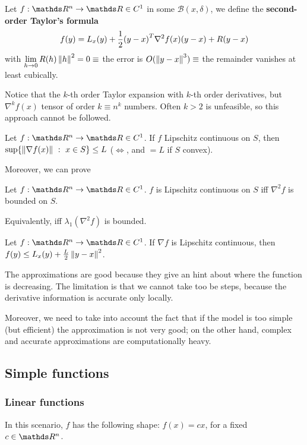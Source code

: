 \documentclass[computationalMathematics.tex]{subfiles}
\begin{document}
\begin{definition}
Let $f : \R^n \to \R \in C^1$ in some $\mathcal{B}(x, \delta)$, we define the \textbf{second-order Taylor's formula}  
\[
  f(y) = L_x(y) + \frac{1}{2} {(y - x)}^{T} \nabla^2 f(x) (y - x) + R(y - x)
\]
  with $\lim\limits_{h \to 0} R(h) \left\lVert h\right\rVert^2 = 0 \equiv$ the error is $O(\left\lVert y - x\right\rVert^3) \equiv$ the remainder vanishes at least cubically.
\end{definition}

Notice that the $k$-th order Taylor expansion with $k$-th order derivatives, but $\nabla^k f(x)$ tensor of order $k \equiv n^k$ numbers.
Often $k > 2$ is unfeasible, so this approach cannot be followed.

\begin{proposition}
  Let $f : \R^n \to \R \in C^1$. If $f$ Lipschitz continuous on $S$, then $\sup \{\left\lVert\nabla f(x)\right\rVert~:~x \in S\} \leq L$ ($\iff$, and $= L$ if $S$ convex).
\end{proposition}

Moreover, we can prove

\begin{proposition}
Let $f : \R^n \to \R \in C^1$. $f$ is Lipschitz continuous on $S$ iff $\nabla^2 f$ is bounded on $S$.

Equivalently, iff $\lambda_1(\nabla^2 f)$ is bounded.
\end{proposition}

\begin{proposition}
  Let $f : \R^n \to \R \in C^1$. If $\nabla f$ is Lipschitz continuous, then $f(y) \leq L_x(y) + \frac{L}{2} \left\lVert y - x\right\rVert^2$.
\end{proposition}

The approximations are good because they give an hint about where the function is decreasing.
The limitation is that we cannot take too be steps, because the derivative information is accurate only locally.

Moreover, we need to take into account the fact that if the model is too simple (but efficient) the approximation is not very good; on the other hand, complex and accurate approximations are computationally heavy.

\subsection{Simple functions}

\subsubsection{Linear functions}
In this scenario, $f$ has the following shape: $f(x) = cx$, for a fixed $c \in \R^n$.
\end{document}

